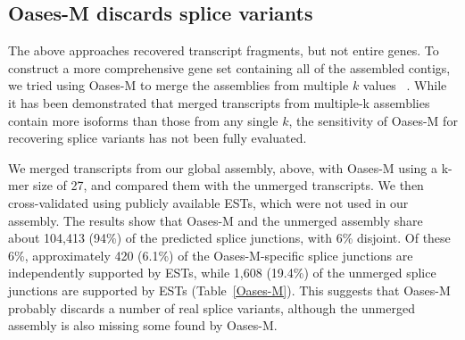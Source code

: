 


\subsection{Oases-M discards splice variants}

The above approaches recovered transcript fragments, but not
entire genes.  To construct a more comprehensive gene set
containing all of the assembled contigs, we tried using Oases-M
to merge the assemblies from multiple $k$ values
~\cite{Schulz:2012je}.  While it has been demonstrated that merged
transcripts from multiple-k assemblies contain more isoforms than
those from any single $k$, the sensitivity of Oases-M for
recovering splice variants has not been fully evaluated.


We merged transcripts from our global assembly, above, with Oases-M using a
k-mer size of 27, and compared them with the unmerged transcripts.  We then
cross-validated using publicly available ESTs, which were not used in our
assembly.  The results show that Oases-M and the unmerged assembly share about
104,413 (94\%) of the predicted splice junctions, with 6\% disjoint.  Of these
6\%, approximately 420 (6.1\%) of the Oases-M-specific splice junctions are
independently supported by ESTs, while 1,608 (19.4\%) of the unmerged splice
junctions are supported by ESTs (Table~\ref{Oases-M}).  This suggests that Oases-M
probably discards a number of real splice variants, although the unmerged
assembly is also missing some found by Oases-M.

